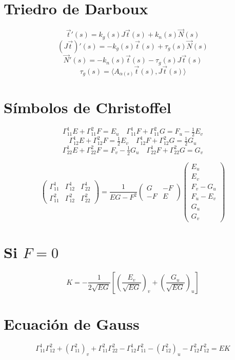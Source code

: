 \documentclass[10pt]{article}
\begin{document}
\begin{multicols}{3}
\section*{Triedro de Darboux}
\[
\vec{t}'(s) = k_g(s) J\vec{t}(s) + k_n(s)\vec{N}(s)
\]
\[
(J\vec{t})'(s) = -k_g(s)\vec{t}(s) + \tau_g(s)\vec{N}(s)
\]
\[
\vec{N}'(s) = -k_n(s)\vec{t}(s) - \tau_g(s) J\vec{t}(s)
\]
\[
\tau_g(s) = \langle A_{\alpha(s)} \vec{t}(s), J\vec{t}(s) \rangle
\]

\section*{Símbolos de Christoffel}
\[
\Gamma^1_{11} E + \Gamma^2_{11} F = E_u
\quad
\Gamma^1_{11} F + \Gamma^2_{11} G = F_u - \tfrac{1}{2} E_v
\]
\[
\Gamma^1_{12} E + \Gamma^2_{12} F = \tfrac{1}{2} E_v
\quad
\Gamma^1_{12} F + \Gamma^2_{12} G = \tfrac{1}{2} G_u
\]
\[
\Gamma^1_{22} E + \Gamma^2_{22} F = F_v - \tfrac{1}{2} G_u
\quad
\Gamma^1_{22} F + \Gamma^2_{22} G = G_v
\]

\[
\begin{pmatrix}
\Gamma^1_{11} & \Gamma^1_{12} & \Gamma^1_{22} \\
\Gamma^2_{11} & \Gamma^2_{12} & \Gamma^2_{22}
\end{pmatrix}
=
\frac{1}{EG - F^2}
\begin{pmatrix}
G & -F \\
-F & E
\end{pmatrix}
\begin{pmatrix}
E_u \\ E_v \\ F_v - G_u \\
F_u - E_v \\ G_u \\ G_v
\end{pmatrix}
\]

\section*{Si $F = 0$}
\[
K = -\frac{1}{2\sqrt{EG}} \left[
\left( \frac{E_v}{\sqrt{EG}} \right)_v +
\left( \frac{G_u}{\sqrt{EG}} \right)_u
\right]
\]

\section*{Ecuación de Gauss}
\[
\Gamma^1_{11} \Gamma^2_{12} + (\Gamma^2_{11})_v + \Gamma^2_{11} \Gamma^2_{22}
- \Gamma^1_{12} \Gamma^2_{11} - (\Gamma^2_{12})_u - \Gamma^2_{12} \Gamma^2_{12}
= EK
\]


\end{multicols}
\end{document}
